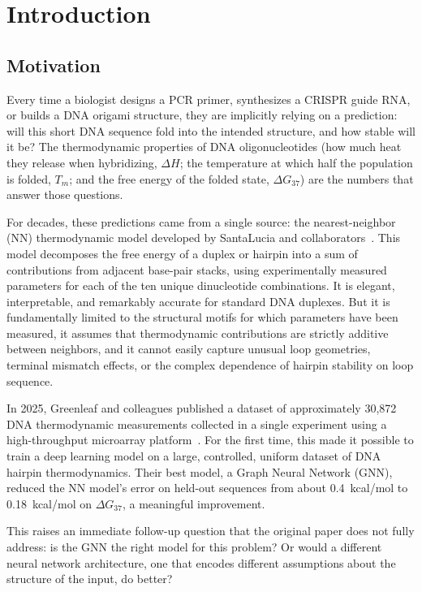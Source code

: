 \documentclass[12pt,oneside,letterpaper]{report}
\newcommand{\dH}{$\Delta H$}
\newcommand{\Tm}{$T_m$}
\newcommand{\dG}{$\Delta G_{37}$}
\begin{document}
\chapter{Introduction}

\section{Motivation}

Every time a biologist designs a PCR primer, synthesizes a CRISPR guide RNA, or builds a DNA origami structure, they are implicitly relying on a prediction: will this short DNA sequence fold into the intended structure, and how stable will it be? The thermodynamic properties of DNA oligonucleotides (how much heat they release when hybridizing, \dH; the temperature at which half the population is folded, \Tm; and the free energy of the folded state, \dG) are the numbers that answer those questions.

For decades, these predictions came from a single source: the nearest-neighbor (NN) thermodynamic model developed by SantaLucia and collaborators~\cite{santalucia1998,santalucia2004}. This model decomposes the free energy of a duplex or hairpin into a sum of contributions from adjacent base-pair stacks, using experimentally measured parameters for each of the ten unique dinucleotide combinations. It is elegant, interpretable, and remarkably accurate for standard DNA duplexes. But it is fundamentally limited to the structural motifs for which parameters have been measured, it assumes that thermodynamic contributions are strictly additive between neighbors, and it cannot easily capture unusual loop geometries, terminal mismatch effects, or the complex dependence of hairpin stability on loop sequence.

In 2025, Greenleaf and colleagues published a dataset of approximately 30,872 DNA thermodynamic measurements collected in a single experiment using a high-throughput microarray platform~\cite{greenleaf2025}. For the first time, this made it possible to train a deep learning model on a large, controlled, uniform dataset of DNA hairpin thermodynamics. Their best model, a Graph Neural Network (GNN), reduced the NN model's error on held-out sequences from about 0.4~kcal/mol to 0.18~kcal/mol on $\Delta G_{37}$, a meaningful improvement.

This raises an immediate follow-up question that the original paper does not fully address: is the GNN the right model for this problem? Or would a different neural network architecture, one that encodes different assumptions about the structure of the input, do better?
\end{document}

